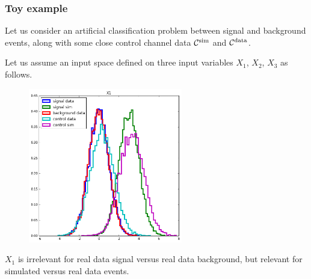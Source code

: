 \documentclass{beamer}
\begin{document}

\begin{frame}
\frametitle{Toy example}

Let us consider an artificial classification problem between signal and
background events, along with some close control channel data ${\cal
C}^\text{sim}$ and ${\cal C}^\text{data}$.

\vspace{0.5cm}

Let us assume an input space defined on three input variables $X_1$, $X_2$,
$X_3$ as follows.

\end{frame}


\begin{frame}

\begin{figure}
\centering
\includegraphics[width=0.6\textwidth]{x1.png}
\end{figure}

$X_1$ is {\color{red} irrelevant} for real data signal versus real data
background, but relevant for simulated versus real data events.

\end{frame}

\end{document}
